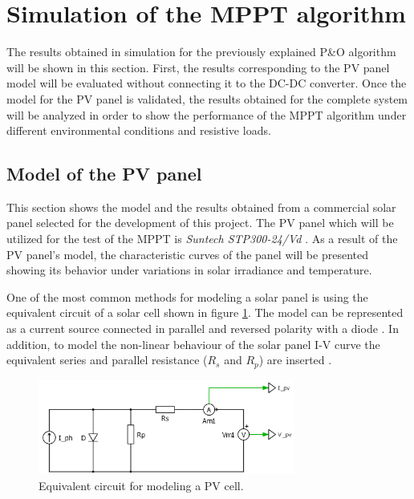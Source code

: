 
\section{Simulation of the MPPT algorithm} \label{MPPTSimulation}

The results obtained in simulation for the previously explained P\&O algorithm will be shown in this section. First, the results corresponding to the PV panel model will be evaluated without connecting it to the DC-DC converter. Once the model for the PV panel is validated, the results obtained for the complete system will be analyzed in order to show the performance of the MPPT algorithm under different environmental conditions and resistive loads.  

\subsection{Model of the PV panel}

This section shows the model and the results obtained from a commercial solar panel selected for the development of this project. The PV panel which will be utilized for the test of the MPPT is \textit{Suntech STP300-24/Vd} \cite{PV_panel}. As a result of the PV panel's model, the characteristic curves of the panel will be presented showing its behavior under variations in solar irradiance and temperature.

One of the most common methods for modeling a solar panel is using the equivalent circuit of a solar cell shown in figure \ref{fig:eq_circuit_PVcell}. The model can be represented as a current source connected in parallel and reversed polarity with a diode \cite{MPPTResearch}. In addition, to model the non-linear behaviour of the solar panel I-V curve the equivalent series and parallel resistance ($R_{s}$ and $R_{p}$) are inserted \cite{MPPTResearch}.

\begin{figure}[H]
	\begin{center}
		\includegraphics[width=0.75\textwidth]{../Pictures/schematic_solar_cell}
		\caption{Equivalent circuit for modeling a PV cell.}
		\label{fig:eq_circuit_PVcell} 
	\end{center}	
\end{figure}

